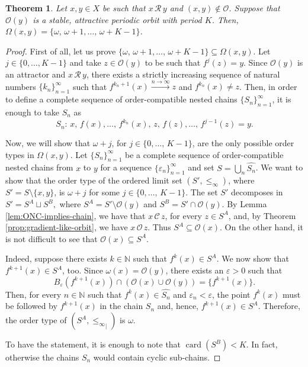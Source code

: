 \documentclass[10pt,a4paper]{article}
\theoremstyle{definition}
\theoremstyle{remark}
\theoremstyle{plain}
\newtheorem{thm}[defi]{Theorem}
\begin{document}
\begin{thm}
    Let $x,y\in X$ be such that $x\,\mathcal{R}\,y$ and $(x,y)\notin\mathcal{O}$. Suppose that $\mathcal{O}(y)$ is a stable, attractive periodic orbit with period $K$. Then, $\Omega(x,y)=\{\omega,\,\omega+1,\dots,\,\omega+K-1\}$.
\end{thm}
\begin{proof}
    First of all, let us prove $\{\omega,\,\omega+1,\dots,\,\omega+K-1\}\subseteq\Omega(x,y)$. Let $j\in\{0,\dots,K-1\}$ and take $z\in\mathcal{O}(y)$ to be such that $f^j(z)=y$.
    Since $\mathcal{O}(y)$ is an attractor and $x\,\mathcal{R}\,y$, there exists a strictly increasing sequence of natural numbers $\{k_n\}_{n=1}^\infty$ such that $f^{k_n+1}(x)\xrightarrow{n\to\infty}z$ and $f^{k_n}(x)\neq z$. Then, in order to define a complete sequence of order-compatible nested chains $\{S_n\}_{n=1}^\infty$, it is enough to take $S_n$ as
    $$S_n:\,x,\,f(x),\dots,\,f^{k_n}(x),\,z,\,f(z),\dots,\,f^{j-1}(z)=y.$$
    
    Now, we will show that $\omega+j$, for $j\in\{0,\dots,\,K-1\}$, are the only possible order types in $\Omega(x,y)$.
    Let $\{S_n\}_{n=1}^\infty$ be a complete sequence of order-compatible nested chains from $x$ to $y$ for a sequence $\{\varepsilon_n\}_{n=1}^\infty$ and set $S=\bigcup_n\widehat{S_n}$. We want to show that the order type of the ordered limit set $(S',\le_\infty)$, where $S'=S\setminus\{x,y\}$, is $\omega+j$ for some $j\in\{0,\dots,\,K-1\}$. The set $S'$ decomposes in
    $S'=S^A\sqcup S^B,$
    where $S^A=S'\setminus\mathcal{O}(y)$ and $S^B=S'\cap\mathcal{O}(y)$.
    By Lemma \ref{lem:ONC-implies-chain}, we have that $x\,\mathcal{C}\,z$, for every $z\in S^A$, and, by Theorem \ref{prop:gradient-like-orbit}, we have $x\,\mathcal{O}\,z$. Thus $S^A\subseteq\mathcal{O}(x)$. On the other hand, it is not difficult to see that $\mathcal{O}(x)\subseteq S^A$.
    
    Indeed, suppose there exists $k\in\mathbb N$ such that $f^k(x)\in S^A$. We now show that $f^{k+1}(x)\in S^A$, too. Since $\omega(x)=\mathcal{O}(y)$, there exists an $\varepsilon>0$ such that
    $$B_\varepsilon(f^{k+1}(x))\cap(\mathcal{O}(x)\cup\mathcal{O}(y))=\{f^{k+1}(x)\}.$$
    Then, for every $n\in\mathbb N$ such that $f^k(x)\in\widehat{S_n}$ and $\varepsilon_n<\varepsilon$, the point $f^k(x)$ must be followed by $f^{k+1}(x)$ in the chain $S_n$ and, hence, $f^{k+1}(x)\in S^A$.
    Therefore, the order type of $(S^A,{\le_\infty}_|)$ is $\omega$.

    To have the statement, it is enough to note that $\operatorname{card}(S^B)<K$. In fact, otherwise the chains $S_n$ would contain cyclic sub-chains.
\end{proof}
\end{document}
